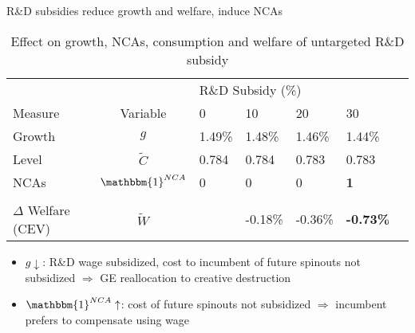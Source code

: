 \documentclass[english,usenames,dvipsnames]{beamer}
\begin{document}
\begin{frame}{R\&D subsidies reduce growth and welfare, induce NCAs}\label{RDsubsidy_table}
		\begin{table}
			\centering
			\small
			\caption*{Effect on growth, NCAs, consumption and welfare of untargeted R\&D subsidy}
			\begin{tabular}{lclllll}
				\toprule \toprule
				 &  & \multicolumn{4}{l}{R\&D Subsidy (\%)} \vspace{3pt} \tabularnewline
				Measure &Variable & 0 & 10 & 20 & 30 \tabularnewline
				\midrule
				Growth & $g$ & 1.49\% & 1.48\% & 1.46\% & 1.44\% \tabularnewline
				Level & $\tilde{C}$  & 0.784 &  0.784 & 0.783 & 0.783 \tabularnewline 
				NCAs & $\mathbbm{1}^{NCA}$ & 0 & 0 & 0 & \alert{\textbf{1}} \tabularnewline
				\tabularnewline
				$\Delta$ Welfare (CEV) & $\tilde{W}$  &  & -0.18\% & -0.36\% & \alert{\textbf{-0.73\%}} \tabularnewline
				\bottomrule
			\end{tabular}
		\end{table}
		\hyperlink{rd_subsidies:decomposition_growth_decrease}{}
		\hyperlink{plots:rd_subsidies1}{}
		\hyperlink{plots:rd_subsidies2}{}
		\hyperlink{rd_subsidies:intuition}{}
		\begin{itemize}
			\small
			\item $g \downarrow$: R\&D wage subsidized, cost to incumbent of future spinouts not subsidized $\Rightarrow$ GE reallocation to creative destruction
			\item $\mathbbm{1}^{NCA} \uparrow$: cost of future spinouts not subsidized $\Rightarrow$ incumbent prefers to compensate using wage
		\end{itemize}
\end{frame}
\end{document}
